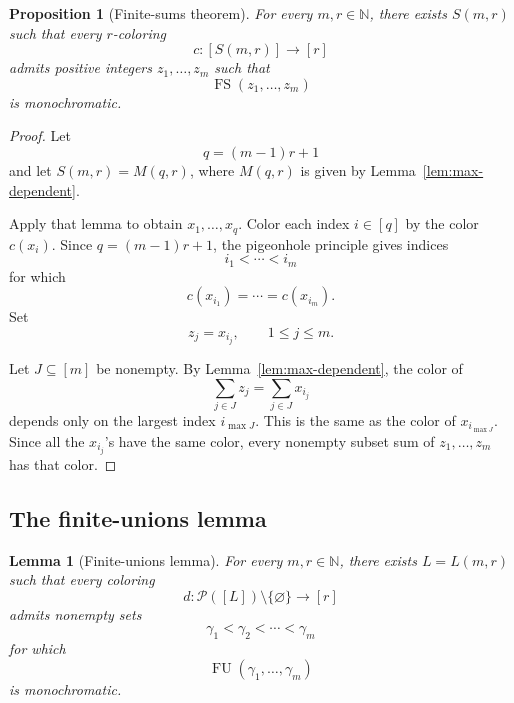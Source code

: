 \documentclass[11pt]{article}
\newtheorem{lemma}[theorem]{Lemma}
\newtheorem{proposition}[theorem]{Proposition}
\newcommand{\N}{\mathbb N}
\newcommand{\Pow}{\mathcal P}
\newcommand{\FU}{\operatorname{FU}}
\newcommand{\FS}{\operatorname{FS}}
\begin{document}
\begin{proposition}[Finite-sums theorem]
  \label{prop:finite-sums}
  For every \(m,r\in\N\), there exists \(S(m,r)\) such that every
  \(r\)-coloring
  \[
    c:[S(m,r)]\longrightarrow[r]
  \]
  admits positive integers \(z_1,\dots,z_m\) such that
  \[
    \FS(z_1,\dots,z_m)
  \]
  is monochromatic.
\end{proposition}

\begin{proof}
  Let
  \[
    q=(m-1)r+1
  \]
  and let \(S(m,r)=M(q,r)\), where \(M(q,r)\) is given by
  Lemma~\ref{lem:max-dependent}.

  Apply that lemma to obtain \(x_1,\dots,x_q\). Color each index
  \(i\in[q]\) by the color \(c(x_i)\). Since \(q=(m-1)r+1\), the
  pigeonhole principle gives indices
  \[
    i_1<\cdots<i_m
  \]
  for which
  \[
    c(x_{i_1})=\cdots=c(x_{i_m}).
  \]
  Set
  \[
    z_j=x_{i_j},
    \qquad 1\leq j\leq m.
  \]

  Let \(J\subseteq[m]\) be nonempty. By
  Lemma~\ref{lem:max-dependent}, the color of
  \[
    \sum_{j\in J}z_j
    =
    \sum_{j\in J}x_{i_j}
  \]
  depends only on the largest index \(i_{\max J}\). This is the same as
  the color of \(x_{i_{\max J}}\). Since all the \(x_{i_j}\)'s have the
  same color, every nonempty subset sum of \(z_1,\dots,z_m\) has that
  color.
\end{proof}

\subsection{The finite-unions lemma}

\begin{lemma}[Finite-unions lemma]
  \label{lem:finite-unions}
  For every \(m,r\in\N\), there exists \(L=L(m,r)\) such that every
  coloring
  \[
    d:\Pow([L])\setminus\{\varnothing\}\longrightarrow[r]
  \]
  admits nonempty sets
  \[
    \gamma_1<\gamma_2<\cdots<\gamma_m
  \]
  for which
  \[
    \FU(\gamma_1,\dots,\gamma_m)
  \]
  is monochromatic.
\end{lemma}
\end{document}
